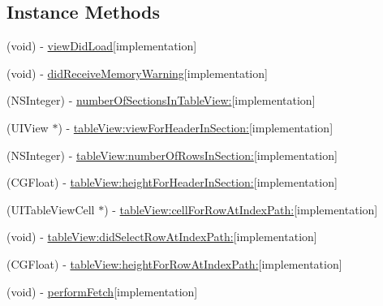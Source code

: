\subsection*{Instance Methods}
\begin{DoxyCompactItemize}
\item 
(void) -\/ \hyperlink{interface_verordnungen_view_controller_af2dd9dac44165fd6edebac15b665f355}{view\+Did\+Load}{\ttfamily  \mbox{[}implementation\mbox{]}}
\item 
(void) -\/ \hyperlink{interface_verordnungen_view_controller_a78b9d417b4ae9a2be3f5dc7b2a1aedc9}{did\+Receive\+Memory\+Warning}{\ttfamily  \mbox{[}implementation\mbox{]}}
\item 
(N\+S\+Integer) -\/ \hyperlink{interface_verordnungen_view_controller_a6766552c21d0481beb357a79da8386af}{number\+Of\+Sections\+In\+Table\+View\+:}{\ttfamily  \mbox{[}implementation\mbox{]}}
\item 
(U\+I\+View $\ast$) -\/ \hyperlink{interface_verordnungen_view_controller_a6cab21ff9a98751c1f8011b205fbc2ec}{table\+View\+:view\+For\+Header\+In\+Section\+:}{\ttfamily  \mbox{[}implementation\mbox{]}}
\item 
(N\+S\+Integer) -\/ \hyperlink{interface_verordnungen_view_controller_a6593fa09a9d10f230176c25ca8d2508b}{table\+View\+:number\+Of\+Rows\+In\+Section\+:}{\ttfamily  \mbox{[}implementation\mbox{]}}
\item 
(C\+G\+Float) -\/ \hyperlink{interface_verordnungen_view_controller_a04216418bb43731076527044480555ba}{table\+View\+:height\+For\+Header\+In\+Section\+:}{\ttfamily  \mbox{[}implementation\mbox{]}}
\item 
(U\+I\+Table\+View\+Cell $\ast$) -\/ \hyperlink{interface_verordnungen_view_controller_a1c841ed2c4d6034c2370bc46310b421d}{table\+View\+:cell\+For\+Row\+At\+Index\+Path\+:}{\ttfamily  \mbox{[}implementation\mbox{]}}
\item 
(void) -\/ \hyperlink{interface_verordnungen_view_controller_ad7cd70b1ea54e546ecdf52246693c679}{table\+View\+:did\+Select\+Row\+At\+Index\+Path\+:}{\ttfamily  \mbox{[}implementation\mbox{]}}
\item 
(C\+G\+Float) -\/ \hyperlink{interface_verordnungen_view_controller_a81aacea481ead50c16997f0e94be77a5}{table\+View\+:height\+For\+Row\+At\+Index\+Path\+:}{\ttfamily  \mbox{[}implementation\mbox{]}}
\item 
(void) -\/ \hyperlink{interface_verordnungen_view_controller_ae20e2b15cb85d1dabb24dbb437d5e0f2}{perform\+Fetch}{\ttfamily  \mbox{[}implementation\mbox{]}}
\item 

\end{DoxyCompactItemize}
